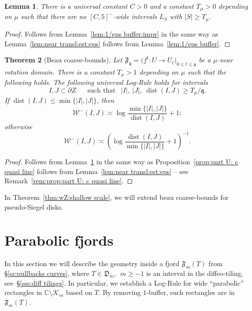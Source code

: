 \documentclass{amsart}
\renewcommand{\sp}{{\ \ }}
\newcommand{\1}{{\mathbb 1 }}
\newcommand{\Width}{{\mathcal W}}
\newcommand{\epscasc}{{\mu}}
\newcommand{\tF}{{\mathfrak F}}
\newcommand{\qq}{\mathfrak{q}}
\newcommand{\C}{\mathbb{C}}
\newcommand{\Dbb}{{\mathfrak{D}}}
\newtheorem{thm}{Theorem}[section]
\newtheorem{lem}[thm]{Lemma}
\theoremstyle{remark}
\numberwithin{equation}{section}
\theoremstyle{definition}
\newcommand{\filled}{{\mathcal {K} }}
\newcommand{\dist}{\operatorname{dist}}
\newcommand{\Fjord}{{\mathfrak F}}
\begin{document}
\begin{lem}
\label{lem:near transl:est:eps:impr}
There is a universal constant $C>0$ and a constant $T_\epscasc>0$ depending on $\epscasc$ such that there are no  $[C,5]^-$-wide intervals $L_S$ with $|S|\ge T_\epscasc$.
\end{lem}
\begin{proof}
Follows from Lemma~\ref{lem:1/eps buffer:impr} in the same way as Lemma~\ref{lem:near transl:est:eps} follows from Lemma~\ref{lem:1/eps buffer}.
\end{proof}



\begin{thm}[Beau coarse-bounds]
\label{thm:beau:part U: c quasi line} Let $\tF_\qq=\big( f^t \colon U\to U_t\big)_{0
\le t \le \qq}$ be a $\epscasc$-near rotation domain. 
There is a constant $T_\epscasc>1$ depending on $\epscasc$ such that the following holds. The following \emph{universal Log-Rule} holds for intervals \[I,J\subset \partial Z\sp\sp\sp\text{ such that }\sp |I|,\ |J|,\ \dist(I,J) \ge T_\epscasc/\qq .\] If $\dist (I,J)\le \min\{|I|,|J|\}$, then
\begin{equation}
\label{eq:1:lmm:beau:nrd:W^- I J}
\Width^-(I,J) \asymp \log \frac{\min\{|I|,|J|\}}{\dist (I,J)} +1;
\end{equation}
otherwise 
\begin{equation}
\label{eq:2:lmm:beau:nrd:W^- I J}
\Width^-(I,J) \asymp \left( \log \frac{\dist (I,J)}{\min\{|I|,|J|\}} +1\right)^{-1}.
\end{equation} 


\end{thm}
\begin{proof}
Follows from Lemma~\ref{lem:near transl:est:eps:impr} in the same way as Proposition~\ref{prop:part U: c quasi line} follows from Lemma~\ref{lem:near transl:est:eps} -- see Remark~\ref{rem:prop:part U: c quasi line}.
\end{proof}

In Theorem~\ref{thm:wZ:shallow scale}, we will extend beau coarse-bounds for pseudo-Siegel disks.





\section{Parabolic fjords}
\label{s:par fjords}
In this section we will describe the geometry inside a fjord $\Fjord_m(T)$ from \S\ref{ss:pullbacks curves}, where $T\in \Dbb_m, \sp m\ge -1$ is an interval in the diffeo-tiling, see~\S\ref{sss:diff tilings}. In particular, we establish a Log-Rule for wide ``parabolic'' rectangles in $\C\setminus \filled_m$ based on $T$. By removing $1$-buffer, such rectangles are in $\Fjord_m(T)$.
\end{document}
